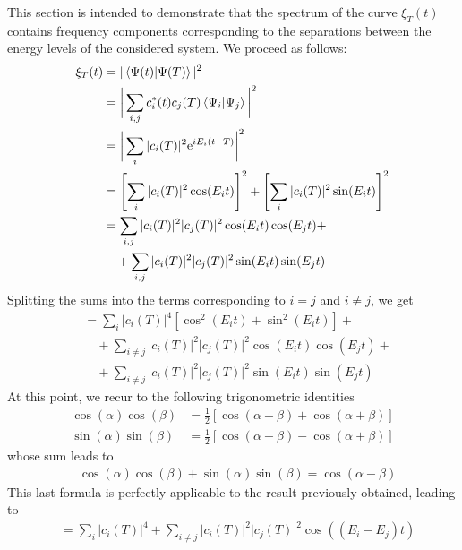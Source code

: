 This section is intended to demonstrate that the spectrum of the curve $\xi_T(t)$ contains frequency components corresponding to the separations between the energy levels of the considered system. We proceed as follows:
\begin{align*}
    \xi_T(t) &= \vert \left\langle \Psi(t) \middle| \Psi(T) \right\rangle \vert^2 \\
    &= \bigg\vert \sum_{i,j} c_i^*(t) c_j(T) \braket{\Psi_i}{\Psi_j} \bigg\vert^2 \\
    &= \bigg\vert \sum_{i} \vert c_i(T) \vert^2 \text{e}^{i E_i (t-T)} \bigg\vert^2 \\
    &= \left[ \sum_i \vert c_i(T) \vert^2 \cos(E_i t) \right]^2 + \left[ \sum_i \vert c_i(T) \vert^2 \sin(E_i t) \right]^2 \\
    &= \sum_{i,j} \vert c_i(T) \vert^2 \vert c_j(T) \vert^2 \cos(E_i t) \cos(E_j t) + \\
    &\quad +\sum_{i,j} \vert c_i(T) \vert^2 \vert c_j(T) \vert^2 \sin(E_i t) \sin(E_j t) \\
\end{align*}
Splitting the sums into the terms corresponding to $i=j$ and $i\neq j$, we get
\begin{align*}
    &= \sum_i \vert c_i(T) \vert^4 \left[ \cos^2(E_i t) + \sin^2(E_i t) \right] + \\
    &\quad + \sum_{i\neq j} \vert c_i(T) \vert^2 \vert c_j(T) \vert^2 \cos(E_i t) \cos(E_j t) + \\
    &\quad + \sum_{i\neq j} \vert c_i(T) \vert^2 \vert c_j(T) \vert^2 \sin(E_i t) \sin(E_j t)
\end{align*}
At this point, we recur to the following trigonometric identities
\begin{align*}
    \cos(\alpha) \cos(\beta) &= \frac{1}{2} \left[ \cos(\alpha - \beta) + \cos(\alpha + \beta) \right] \\
    \sin(\alpha) \sin(\beta) &= \frac{1}{2} \left[ \cos(\alpha-\beta) - \cos(\alpha + \beta) \right]
\end{align*}
whose sum leads to 
\begin{align*}
    &\cos(\alpha) \cos(\beta) + \sin(\alpha) \sin(\beta) = \cos(\alpha - \beta)
\end{align*}
This last formula is perfectly applicable to the result previously obtained, leading to
\begin{align*}
    &= \sum_i \vert c_i(T) \vert^4 + \sum_{i\neq j} \vert c_i(T) \vert^2 \vert c_j(T) \vert^2 \cos((E_i - E_j)t)
\end{align*}


